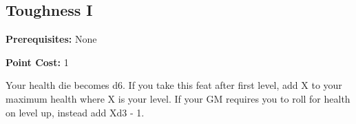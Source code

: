 \subsection{Toughness I}\label{feat:toughness1}

\noindent
\textbf{Prerequisites:} None

\noindent
\textbf{Point Cost:} 1 

Your health die becomes d6. If you take this feat after first level, add X to
your maximum health where X is your level. If your GM requires you to roll for
health on level up, instead add Xd3 - 1.
